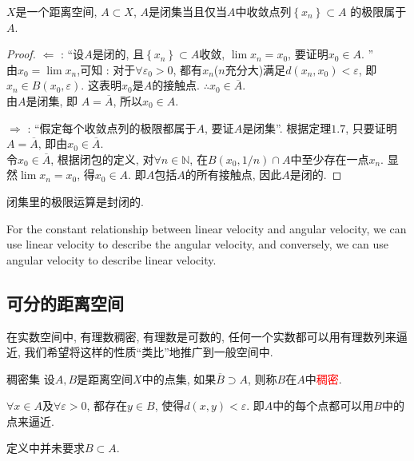\documentclass[lang=cn,10pt]{gorgeousnbook}
\numberwithin{equation}{section}%
\numberwithin{figure}{section}%
\begin{document}
\begin{theorem}
$X$是一个距离空间, $A\subset X$, $A$是闭集当且仅当$A$中收敛点列$\left\{ x_n \right\} \subset A$ 的极限属于$A$. 
\end{theorem}
\begin{proof}
$\Leftarrow$ : ``设$A$是闭的, 且$\left\{ x_n \right\} \subset A$收敛, $\lim x_n=x_0$, 要证明$x_0 \in A$. ''\\
由$x_0 = \lim x_n$,可知 : 对于$\forall\varepsilon_0 > 0$, 都有$x_n$($n$充分大)满足$d\left(x_n,x_0\right) < \varepsilon$, 即$x_n \in B\left(x_0,\varepsilon \right)$. 这表明$x_0$是$A$的接触点. $\therefore x_0 \in \overline{A}$.\\
由$A$是闭集, 即 $A = \overline{A}$, 所以$x_0 \in A$.

$\Rightarrow$ : ``假定每个收敛点列的极限都属于$A$, 要证$A$是闭集''.
根据定理$1.7$, 只要证明$A = \overline{A}$, 即由$x_0 \in \overline{A}$. \\
令$x_0 \in \overline{A}$, 根据闭包的定义, 对$\forall n \in \mathbb{N}$, 在$B\left( x_0,1/n\right) \cap A$中至少存在一点$x_n$. 显然$\lim x_n = x_0$, 得$x_0 \in A$. 即$A$包括$A$的所有接触点, 因此$A$是闭的.
\end{proof}

\begin{note}
闭集里的极限运算是封闭的.
\end{note}

\begin{marker}
    For the constant relationship between linear velocity and angular velocity, we can use linear velocity to describe the angular velocity, and conversely, we can use angular velocity to describe linear velocity.
\end{marker}

\subsection{可分的距离空间}
在实数空间中, 有理数稠密, 有理数是可数的, 任何一个实数都可以用有理数列来逼近, 我们希望将这样的性质``类比''地推广到一般空间中. 
\begin{definition}{稠密集}
设$A, B$是距离空间$X$中的点集, 如果$\overline{B}\supset A$, 则称$B$在$A$中\textcolor{red}{稠密}. 
\par
$\forall x \in A$及$\forall \varepsilon>0$, 都存在$y\in B$, 使得$d(x,y)<\varepsilon$. 即$A$中的每个点都可以用$B$中的点来逼近. 
\end{definition}
\begin{note}
定义中并未要求$B\subset A$.
\end{note}
\end{document}
